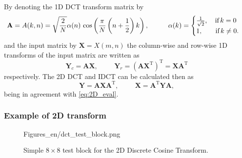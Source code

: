 By denoting the 1D DCT transform matrix by 
\begin{equation}
\mathbf{A} = A(k,n) =  \sqrt{\frac{2}{N}}  \alpha(n) \, \cos\left( \frac{\pi}{N} \left( n + \frac{1}{2}\right) k \right),
\hspace{10mm}
\alpha(k) = \begin{cases}  
\frac{1}{\sqrt{2}}, \hspace{3mm} \, \text{if} \, k = 0 \\
1, \hspace{6mm} \, \text{if} \, k \neq 0.
\label{Eq:1D_DCT_mx}
\end{cases}
\end{equation}
and the input matrix by $\mathbf{X} = X(m,n)$ the column-wise and row-wise 1D transforms of the input matrix are written as
\begin{equation}
\mathbf{Y}_{c} = \mathbf{A} \mathbf{X}, \hspace{1cm} \mathbf{Y}_r = \left( \mathbf{A} \mathbf{X}^{\mathrm{T}} \right)^{\mathrm{T}} = \mathbf{X} \mathbf{A}^{\mathrm{T}}
\end{equation}
respectively.
The 2D DCT and IDCT can be calculated then as
\begin{equation}
\mathbf{Y} = \mathbf{A} \mathbf{X} \mathbf{A}^{\mathrm{T}}, \hspace{1cm}
\mathbf{X} = \mathbf{A}^{\mathrm{T}} \mathbf{Y} \mathbf{A},
\label{Eq:2D_DCT_eval}
\end{equation}
being in agreement with \eqref{eq:2D_eval}.

\subsubsection*{Example of 2D transform}
\begin{figure}[]
	\centering
	\begin{minipage}[c]{0.75\textwidth}
	\begin{overpic}[width = 1\columnwidth ]{Figures_en/dct_test_block.png}
	\end{overpic}   \end{minipage}\hfill
		\begin{minipage}[c]{0.23\textwidth}
	\caption{Simple $8\times8$ test block for the 2D Discrete Cosine Transform.}
	\label{Fig:2D_DCT_test}  \end{minipage}
\end{figure}

